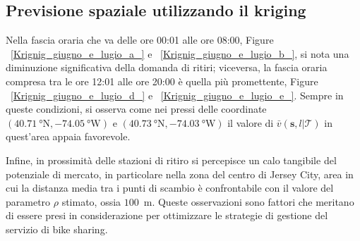 \subsection{Previsione spaziale utilizzando il kriging}
Nella fascia oraria che va delle ore 00:01 alle ore 08:00, Figure ~\ref{Krignig_giugno_e_lugio_a_} e ~\ref{Krignig_giugno_e_lugio_b_}, si nota una diminuzione significativa della domanda di ritiri; viceversa, la fascia oraria compresa tra le ore 12:01 alle ore 20:00 è quella più promettente, Figure ~\ref{Krignig_giugno_e_lugio_d_} e ~\ref{Krignig_giugno_e_lugio_e_}. Sempre in queste condizioni, si osserva come nei pressi delle coordinate $(\SI{40.71}{\degree} \text{N}, \SI{-74.05}{\degree} \text{W})$ e $(\SI{40.73}{\degree} \text{N}, \SI{-74.03}{\degree} \text{W})$ il valore di $\bar{v}(\mathbf{s}, l |\mathcal{T})$ in quest'area appaia favorevole.
\par Infine, in prossimità delle stazioni di ritiro si percepisce un calo tangibile del potenziale di mercato, in particolare nella zona del centro di Jersey City, area in cui la distanza media tra i punti di scambio è confrontabile con il valore del parametro $\rho$ stimato, ossia $100$~\unit{\meter}. Queste osservazioni sono fattori che meritano di essere presi in considerazione per ottimizzare le strategie di gestione del servizio di bike sharing.

